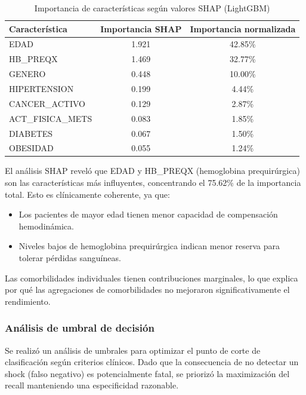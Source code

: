 \documentclass[12pt, letterpaper]{article}
\begin{document}
\begin{table}[H]
\centering
\caption{Importancia de características según valores SHAP (LightGBM)}
\label{tab:shap-importance}
\begin{tabular}{|l|c|c|}
\hline
\textbf{Característica} & \textbf{Importancia SHAP} & \textbf{Importancia normalizada} \\ \hline
EDAD & 1.921 & 42.85\% \\ \hline
HB\_PREQX & 1.469 & 32.77\% \\ \hline
GENERO & 0.448 & 10.00\% \\ \hline
HIPERTENSION & 0.199 & 4.44\% \\ \hline
CANCER\_ACTIVO & 0.129 & 2.87\% \\ \hline
ACT\_FISICA\_METS & 0.083 & 1.85\% \\ \hline
DIABETES & 0.067 & 1.50\% \\ \hline
OBESIDAD & 0.055 & 1.24\% \\ \hline
\end{tabular}
\end{table}

El análisis SHAP reveló que EDAD y HB\_PREQX (hemoglobina prequirúrgica) son las características más influyentes, concentrando el 75.62\% de la importancia total. Esto es clínicamente coherente, ya que:

\begin{itemize}
    \item Los pacientes de mayor edad tienen menor capacidad de compensación hemodinámica.
    \item Niveles bajos de hemoglobina prequirúrgica indican menor reserva para tolerar pérdidas sanguíneas.
\end{itemize}

Las comorbilidades individuales tienen contribuciones marginales, lo que explica por qué las agregaciones de comorbilidades no mejoraron significativamente el rendimiento.

\subsubsection{Análisis de umbral de decisión}

Se realizó un análisis de umbrales para optimizar el punto de corte de clasificación según criterios clínicos. Dado que la consecuencia de no detectar un shock (falso negativo) es potencialmente fatal, se priorizó la maximización del recall manteniendo una especificidad razonable.
\end{document}
